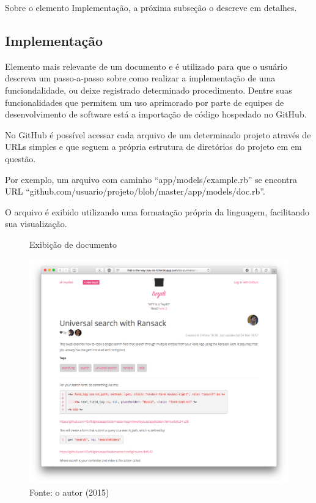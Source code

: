 Sobre o elemento Implementação, a próxima subseção o descreve em detalhes.

\subsection{Implementação}

Elemento mais relevante de um documento e é utilizado para que o usuário descreva um passo-a-passo sobre como realizar a implementação de uma funciondalidade, ou deixe registrado determinado procedimento. Dentre suas funcionalidades que permitem um uso aprimorado por parte de equipes de desenvolvimento de software está a importação de código hospedado no GitHub.

No GitHub é possível acessar cada arquivo de um determinado projeto através de URLs simples e que seguem a própria estrutura de diretórios do projeto em em questão.

Por exemplo, um arquivo com caminho ``app/models/example.rb'' se encontra URL ``github.com/usuario/projeto/blob/master/app/models/doc.rb''.

O arquivo é exibido utilizando uma formatação própria da linguagem, facilitando sua visualização.

\begin{figure}[h]
	\centering
    \caption{Exibição de documento}
    \includegraphics[width=15cm]{Imagens/print-implementation-1.png}
	\caption*{Fonte: o autor (2015)}
\end{figure}

